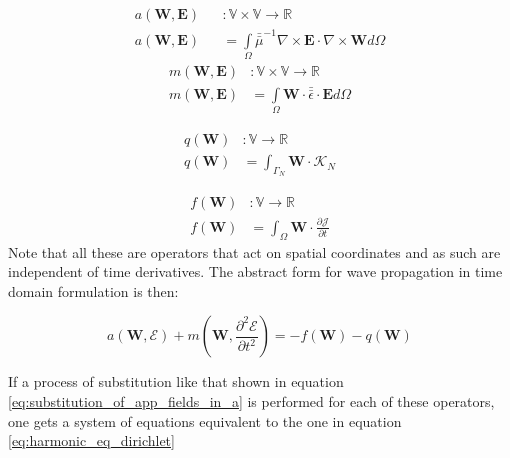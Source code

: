 \begin{equation}
\begin{array}{rcl}
      a(\mathbf{W},\mathbf{E})&&:\mathbb{V}\times \mathbb{V}\rightarrow \mathbb{R}\\
      a(\mathbf{W},\mathbf{E})&&= \int\limits_{\Omega}  \bar{\bar{\mu}}^{-1}\nabla\times \mathbf{E}\cdot \nabla\times\mathbf{W} d\Omega
\label{eq:a_td_def}
\end{array}
\end{equation}
\begin{equation}
\begin{array}{rcl}
      m(\mathbf{W},\mathbf{E})&:\mathbb{V}\times \mathbb{V}\rightarrow \mathbb{R}\\
      m(\mathbf{W},\mathbf{E})&= \int\limits_{\Omega} \mathbf{W}\cdot \bar{\bar{\epsilon}}\cdot \mathbf{E} d\Omega
\label{eq:m_td_def}
\end{array}
\end{equation}

\begin{equation}
\begin{array}{rcl}
      q(\mathbf{W})&:\mathbb{V}\rightarrow \mathbb{R}\\
      q(\mathbf{W})&=\int_{\Gamma_N} \mathbf{W} \cdot\mathcal{K}_N
\label{eq:m_td_def}
\end{array}
\end{equation}

\begin{equation}
\begin{array}{rcl}
      f(\mathbf{W})&:\mathbb{V}\rightarrow \mathbb{R}\\
      f(\mathbf{W})&= \int_{\Omega} \mathbf{W}\cdot\frac{\partial\mathcal{J}}{\partial t}
\label{eq:m_td_def}
\end{array}
\end{equation}
Note that all these are operators that act on spatial coordinates and as such are independent of time derivatives. The abstract form for wave propagation in time domain formulation is then:

\begin{equation}
a\left(\mathbf{W},\mathcal{E}\right)+m\left(\mathbf{W},\frac{\partial^2 \mathcal{E}}{\partial t^2}\right)
=-f\left(\mathbf{W}\right)-q\left(\mathbf{W}\right) 
\end{equation}

If a process of substitution like that shown in equation \ref{eq:substitution_of_app_fields_in_a} is performed for each of these operators, one gets a system of equations equivalent to the one in equation \ref{eq:harmonic_eq_dirichlet}

